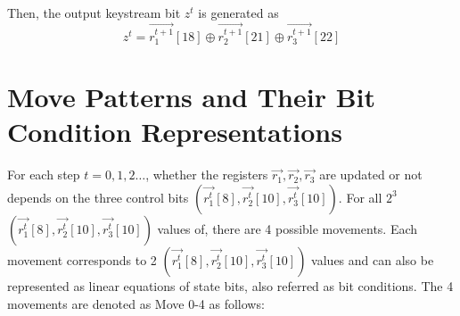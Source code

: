 Then, the output keystream bit $z^t$ is generated as
\begin{equation}\label{eq:OutputZ}
  z^t=\vec{r_1^{t+1}}   [18]\oplus \vec{r_2^{t+1}}[21]\oplus \vec{r_3^{t+1}}[22]
\end{equation}
\section{Move Patterns and Their Bit Condition Representations}
For each step $t=0,1,2\ldots$, whether the registers $\vec{r_1},\vec{r_2},\vec{r_3}$ are updated or not depends on the three control bits $(\vec{r_1^t}[8],\vec{r_2^t}[10],\vec{r_3^t}[10])$.
For all $2^3$ $(\vec{r_1^t}[8],\vec{r_2^t}[10],\vec{r_3^t}[10])$ values of, there are 4 possible movements.
Each movement corresponds to 2 $(\vec{r_1^t}[8],\vec{r_2^t}[10],\vec{r_3^t}[10])$ values and can also be represented as linear equations of state bits, also referred as bit conditions.
The 4 movements are denoted as Move 0-4 as follows:
